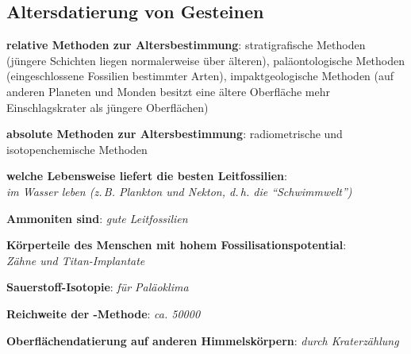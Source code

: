 \pagebreak

\subsection{%
    Altersdatierung von Gesteinen%
}

\textbf{relative Methoden zur Altersbestimmung}:
stratigrafische Methoden
(jüngere Schichten liegen normalerweise über älteren),
paläontologische Methoden
(eingeschlossene Fossilien bestimmter Arten),
impaktgeologische Methoden
(auf anderen Planeten und Monden besitzt eine ältere Oberfläche mehr Einschlagskrater
als jüngere Oberflächen)

\textbf{absolute Methoden zur Altersbestimmung}:
radiometrische und isotopenchemische Methoden

\begin{wichtig}
    \item
    \textbf{welche Lebensweise liefert die besten Leitfossilien}:\\
    \emph{im Wasser leben (z.\,B. Plankton und Nekton, d.\,h. die "`Schwimmwelt"')}
    
    \item
    \textbf{Ammoniten sind}:
    \emph{gute Leitfossilien}
    
    \item
    \textbf{Körperteile des Menschen mit hohem Fossilisationspotential}:\\
    \emph{Zähne und Titan-Implantate}
    
    \item
    \textbf{Sauerstoff-Isotopie}:
    \emph{für Paläoklima}
    
    \item
    \textbf{Reichweite der -Methode}:
    \emph{ca. \SI[math-rm=\mathit,text-rm=\itshape]{50000}{\year}}
    
    \item
    \textbf{Oberflächendatierung auf anderen Himmelskörpern}:
    \emph{durch Kraterzählung}
\end{wichtig}

\pagebreak
